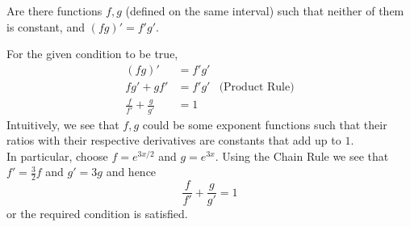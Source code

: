 \documentclass[boxes, qed]{homework}
\begin{document}
\begin{problem}Are there functions $f,g$ (defined on the same interval) such that neither 
  of them is constant, and $(fg)'= f'g'$.
\end{problem}
\begin{solution}For the given condition to be true,
  \begin{align*}
    (fg)'&=f'g'\\
      fg'+gf'&=f'g'
    &\text{(Product Rule)}\\
    \frac{f}{f'}+\frac{g}{g'}&=1
  \end{align*}
  Intuitively, we see that $f,g$ could be some exponent functions
  such that their ratios with their respective derivatives are constants
  that add up to $1$.\\
  In particular, choose $f=e^{3x/2}$ and $g=e^{3x}$. Using the Chain Rule
  we see that $f'=\frac{3}{2}f$ and $g'=3g$ and hence
  $$\frac{f}{f'}+\frac{g}{g'}=1$$ or the required condition is satisfied.
\end{solution}
\end{document}
